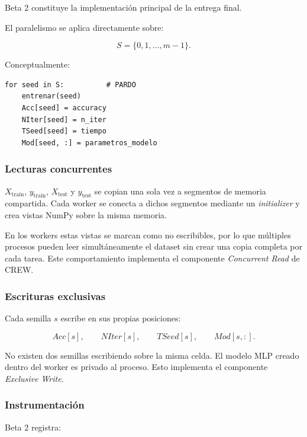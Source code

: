 \documentclass[11pt,a4paper]{article}
\begin{document}
Beta 2 constituye la implementación principal de la entrega final.

El paralelismo se aplica directamente sobre:

\begin{equation}
    S=\{0,1,\ldots,m-1\}.
\end{equation}

Conceptualmente:

\begin{lstlisting}
for seed in S:          # PARDO
    entrenar(seed)
    Acc[seed] = accuracy
    NIter[seed] = n_iter
    TSeed[seed] = tiempo
    Mod[seed, :] = parametros_modelo
\end{lstlisting}

\subsubsection{Lecturas concurrentes}

$X_{\mathrm{train}}$, $y_{\mathrm{train}}$, $X_{\mathrm{test}}$ y
$y_{\mathrm{test}}$ se copian una sola vez a segmentos de memoria compartida. Cada
worker se conecta a dichos segmentos mediante un \emph{initializer} y crea vistas
NumPy sobre la misma memoria.

En los workers estas vistas se marcan como no escribibles, por lo que múltiples procesos
pueden leer simultáneamente el dataset sin crear una copia completa por cada tarea.
Este comportamiento implementa el componente \emph{Concurrent Read} de CREW.

\subsubsection{Escrituras exclusivas}

Cada semilla $s$ escribe en sus propias posiciones:

\begin{equation}
    Acc[s],\qquad
    NIter[s],\qquad
    TSeed[s],\qquad
    Mod[s,:].
\end{equation}

No existen dos semillas escribiendo sobre la misma celda. El modelo MLP creado dentro
del worker es privado al proceso. Esto implementa el componente \emph{Exclusive Write}.

\subsubsection{Instrumentación}

Beta 2 registra:
\end{document}
